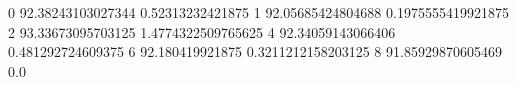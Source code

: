 0 92.38243103027344 0.52313232421875
1 92.05685424804688 0.1975555419921875
2 93.33673095703125 1.4774322509765625
4 92.34059143066406 0.481292724609375
6 92.180419921875 0.3211212158203125
8 91.85929870605469 0.0
